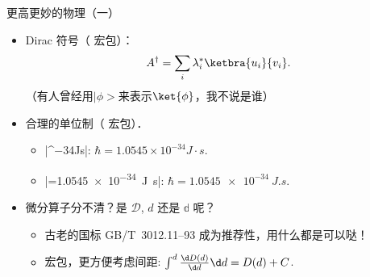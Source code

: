 % 			



\begin{frame}[fragile]{更高更妙的物理（一）}
	\begin{itemize}
		\item<+-> Dirac 符号（ 宏包）：
			\[A^\dagger = \sum_i \lambda _i^*\ketbra{u_i}{v_i}.\]
			（有人曾经用$\vert \phi >$来表示$\ket{\phi }$，我不说是谁）
		\item <+->合理的单位制（ 宏包）．
		      \begin{itemize}
			      \item |^{−34}J\cdot s|: $\hbar=1.0545\times 10^{−34}J\cdot s$.
			      \item |\hbar=\qty[options...]{1.0545e-34}{J.s}|: $\hbar=\qty[inter-unit-product = \ensuremath{{}\cdot{}}]{1.0545e-34}{J.s}$.
		      \end{itemize}
		\item<+-> 微分算子分不清？是 $\mathscr D$, $d$ 还是 $\mathbb d$ 呢？
			\begin{itemize}
				\item 古老的国标 GB/T~3012.11--93 成为推荐性，用什么都是可以哒！
				\item {} 宏包，更方便考虑间距: $\int^d \frac{\d D(d)}{\d d}\d d = D(d)+C$.
			\end{itemize}
	\end{itemize}
\end{frame}

